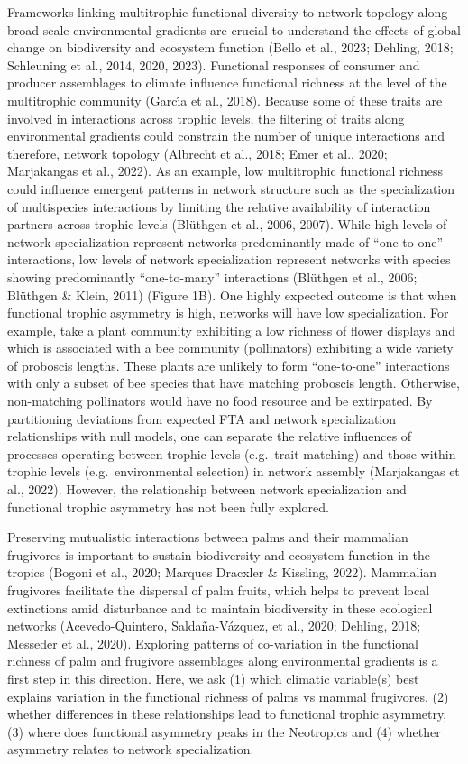 \documentclass[
]{agujournal2019}
\begin{document}
Frameworks linking multitrophic functional diversity to network topology
along broad-scale environmental gradients are crucial to understand the
effects of global change on biodiversity and ecosystem function (Bello
et al., 2023; Dehling, 2018; Schleuning et al., 2014, 2020, 2023).
Functional responses of consumer and producer assemblages to climate
influence functional richness at the level of the multitrophic community
(Garcı́a et al., 2018). Because some of these traits are involved in
interactions across trophic levels, the filtering of traits along
environmental gradients could constrain the number of unique
interactions and therefore, network topology (Albrecht et al., 2018;
Emer et al., 2020; Marjakangas et al., 2022). As an example, low
multitrophic functional richness could influence emergent patterns in
network structure such as the specialization of multispecies
interactions by limiting the relative availability of interaction
partners across trophic levels (Blüthgen et al., 2006, 2007). While high
levels of network specialization represent networks predominantly made
of ``one-to-one'' interactions, low levels of network specialization
represent networks with species showing predominantly ``one-to-many''
interactions (Blüthgen et al., 2006; Blüthgen \& Klein, 2011) (Figure
1B). One highly expected outcome is that when functional trophic
asymmetry is high, networks will have low specialization. For example,
take a plant community exhibiting a low richness of flower displays and
which is associated with a bee community (pollinators) exhibiting a wide
variety of proboscis lengths. These plants are unlikely to form
``one-to-one'' interactions with only a subset of bee species that have
matching proboscis length. Otherwise, non-matching pollinators would
have no food resource and be extirpated. By partitioning deviations from
expected FTA and network specialization relationships with null models,
one can separate the relative influences of processes operating between
trophic levels (e.g.~trait matching) and those within trophic levels
(e.g.~environmental selection) in network assembly (Marjakangas et al.,
2022). However, the relationship between network specialization and
functional trophic asymmetry has not been fully explored.

Preserving mutualistic interactions between palms and their mammalian
frugivores is important to sustain biodiversity and ecosystem function
in the tropics (Bogoni et al., 2020; Marques Dracxler \& Kissling,
2022). Mammalian frugivores facilitate the dispersal of palm fruits,
which helps to prevent local extinctions amid disturbance and to
maintain biodiversity in these ecological networks (Acevedo-Quintero,
Saldaña-Vázquez, et al., 2020; Dehling, 2018; Messeder et al., 2020).
Exploring patterns of co-variation in the functional richness of palm
and frugivore assemblages along environmental gradients is a first step
in this direction. Here, we ask (1) which climatic variable(s) best
explains variation in the functional richness of palms vs mammal
frugivores, (2) whether differences in these relationships lead to
functional trophic asymmetry, (3) where does functional asymmetry peaks
in the Neotropics and (4) whether asymmetry relates to network
specialization.
\end{document}
